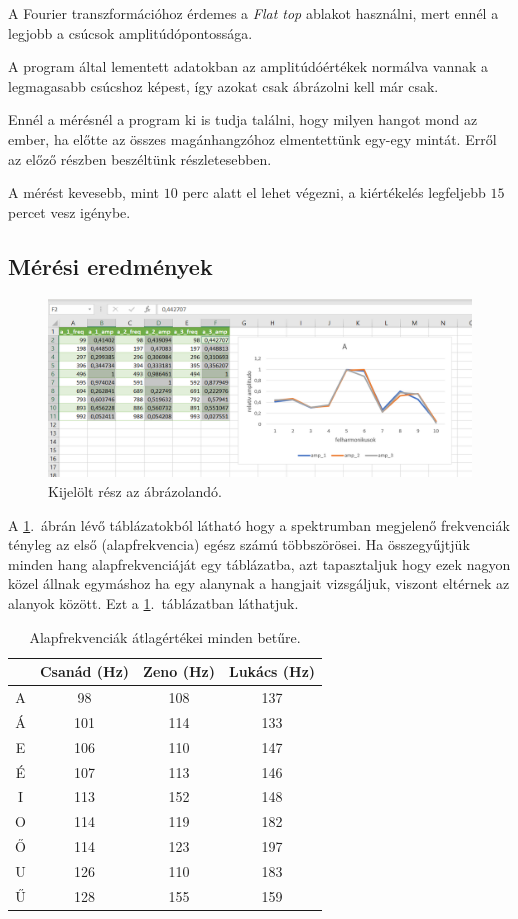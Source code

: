 \documentclass[a4paper,12pt]{article}
\begin{document}
A Fourier transzformációhoz érdemes a \emph{Flat top} ablakot használni, mert ennél a legjobb a csúcsok amplitúdópontossága.

A program által lementett adatokban az amplitúdóértékek normálva vannak a legmagasabb csúcshoz képest, így azokat csak ábrázolni kell már csak.

Ennél a mérésnél a program ki is tudja találni, hogy milyen hangot mond az ember, ha előtte az összes magánhangzóhoz elmentettünk egy-egy mintát. Erről az előző részben beszéltünk részletesebben.

A mérést kevesebb, mint $10$ perc alatt el lehet végezni, a kiértékelés legfeljebb $15$ percet vesz igénybe.

\subsection{Mérési eredmények}

\begin{figure}[h]
\centering
\includegraphics[width=\textwidth]{minta.png}
\caption{Kijelölt rész az ábrázolandó.}
\label{1ábra}
\end{figure}

A \ref{1ábra}.\ ábrán lévő táblázatokból látható hogy a spektrumban megjelenő frekvenciák tényleg az első (alapfrekvencia) egész számú többszörösei. Ha összegyűjtjük minden hang alapfrekvenciáját egy táblázatba, azt tapasztaljuk hogy ezek nagyon közel állnak egymáshoz ha egy alanynak a hangjait vizsgáljuk, viszont eltérnek az alanyok között. Ezt a \ref{1tábla}.\ táblázatban láthatjuk.

\begin{table}[h]
\centering
\begin{tabular}{c|c|c|c}
 & Csanád (Hz) & Zeno (Hz) & Lukács (Hz) \\ 
\hline 
A & 98 & 108 & 137 \\ 
Á & 101 & 114 & 133 \\ 
E & 106 & 110 & 147 \\ 
É & 107 & 113 & 146 \\ 
I & 113 & 152 & 148 \\ 
O & 114 & 119 & 182 \\ 
Ő & 114 & 123 & 197 \\ 
U & 126 & 110 & 183 \\ 
Ű & 128 & 155 & 159 \\ 

\end{tabular} 
\caption{Alapfrekvenciák átlagértékei minden betűre.}
\label{1tábla}
\end{table}  
\end{document}
